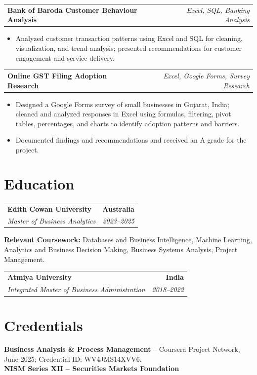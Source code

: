 \documentclass[letterpaper,10pt]{article}
\makeatletter
\newcommand{\role}[4]{%
  \begin{tabularx}{\textwidth}{@{}Xr@{}}
    \textbf{#1} & \textbf{#2} \\
    \textit{#3} & \textit{#4}
  \end{tabularx}\vspace{-1pt}
}
\newcommand{\project}[2]{%
  \begin{tabularx}{\textwidth}{@{}Xr@{}}
    \textbf{#1} & \textit{#2}
  \end{tabularx}\vspace{-1pt}
}
\makeatother
\begin{document}
\project{Bank of Baroda Customer Behaviour Analysis}{Excel, SQL, Banking Analysis}
\begin{itemize}
  \item Analyzed customer transaction patterns using Excel and SQL for cleaning, visualization, and trend analysis; presented recommendations for customer engagement and service delivery.
\end{itemize}
\vspace{1pt}

\project{Online GST Filing Adoption Research}{Excel, Google Forms, Survey Research}
\begin{itemize}
  \item Designed a Google Forms survey of small businesses in Gujarat, India; cleaned and analyzed responses in Excel using formulas, filtering, pivot tables, percentages, and charts to identify adoption patterns and barriers.
  \item Documented findings and recommendations and received an A grade for the project.
\end{itemize}

\section{Education}
\role{Edith Cowan University}{Australia}{Master of Business Analytics}{2023--2025}
\small\textbf{Relevant Coursework:} Databases and Business Intelligence, Machine Learning, Analytics and Business Decision Making, Business Systems Analysis, Project Management.\\[2pt]
\role{Atmiya University}{India}{Integrated Master of Business Administration}{2018--2022}

\section{Credentials}
\small\textbf{Business Analysis \& Process Management} -- Coursera Project Network, June 2025; Credential ID: WV4JMS14XVV6.\\[-0.2pt]
\small\textbf{NISM Series XII -- Securities Markets Foundation}
\end{document}

